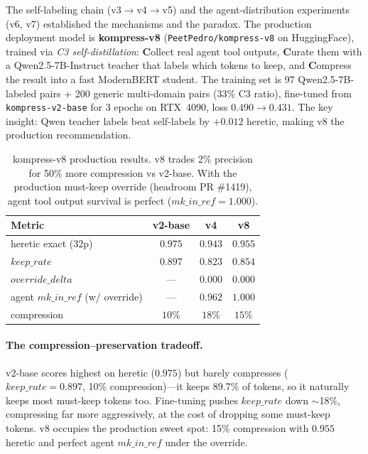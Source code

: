 The self-labeling chain (v3$\to$v4$\to$v5) and the agent-distribution
experiments (v6, v7) established the mechanisms and the paradox. The
production deployment model is \textbf{kompress-v8}
(\texttt{PeetPedro/kompress-v8} on HuggingFace), trained via \emph{C3
self-distillation}: \textbf{C}ollect real agent tool outputs, \textbf{C}urate
them with a Qwen2.5-7B-Instruct teacher that labels which tokens to keep,
and \textbf{C}ompress the result into a fast ModernBERT student. The training
set is 97 Qwen2.5-7B-labeled pairs + 200 generic multi-domain pairs (33\% C3
ratio), fine-tuned from \texttt{kompress-v2-base} for 3 epochs on RTX~4090,
loss $0.490\to0.431$. The key insight: Qwen teacher labels beat self-labels
by $+0.012$ heretic, making v8 the production recommendation.

\begin{table}[h]
\centering
\caption{kompress-v8 production results. v8 trades 2\% precision for 50\%
more compression vs v2-base. With the production must-keep override
(headroom PR \#1419), agent tool output survival is perfect
($\mathit{mk\_in\_ref}{=}1.000$).}
\label{tab:v8_results}
\begin{tabular}{lccc}
\toprule
Metric & v2-base & v4 & \textbf{v8} \\
\midrule
heretic exact (32p)              & $0.975$ & $0.943$ & $\mathbf{0.955}$ \\
$\mathit{keep\_rate}$            & $0.897$ & $0.823$ & $0.854$ \\
$\mathit{override\_delta}$       & ---     & $0.000$ & $\mathbf{0.000}$ \\
agent $\mathit{mk\_in\_ref}$ (w/ override) & --- & $0.962$ & $\mathbf{1.000}$ \\
compression                      & $10\%$  & $18\%$  & $15\%$ \\
\bottomrule
\end{tabular}
\end{table}

\paragraph{The compression--preservation tradeoff.} v2-base scores highest
on heretic ($0.975$) but barely compresses ($\mathit{keep\_rate}{=}0.897$,
10\% compression)---it keeps 89.7\% of tokens, so it naturally keeps most
must-keep tokens too. Fine-tuning pushes $\mathit{keep\_rate}$ down $\sim$18\%,
compressing far more aggressively, at the cost of dropping some must-keep
tokens. v8 occupies the production sweet spot: 15\% compression with
$0.955$ heretic and perfect agent $\mathit{mk\_in\_ref}$ under the override.

